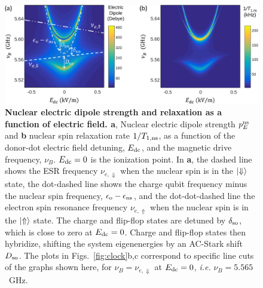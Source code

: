 \begin{figure}
	\centering
	\includegraphics[width=1\textwidth]{fig4_v2}
	\caption[Nuclear electric dipole strength and relaxation as a function of electric field]{\textbf{Nuclear electric dipole strength and relaxation as a function of electric field. a},
	 Nuclear electric dipole strength $p_E^{\rm ns}$ and
		\textbf{b} nuclear spin relaxation rate $1/T_{\rm 1,ns}$, as a function of the donor-dot electric field detuning, $E_{\rm dc}$, and the magnetic drive frequency, $\nu_B$. $E_{\rm dc}=0$ is the ionization point. In \textbf{a}, the dashed line shows the ESR frequency $\nu_{e,\Downarrow}$ when the nuclear spin is in the  $\ket{\Downarrow}$ state, the dot-dashed line shows the charge qubit frequency minus the nuclear spin frequency, $\epsilon_{\rm o} - \epsilon_{\rm ns}$, and the dot-dot-dashed line the electron spin resonance frequency $\nu_{e,\Uparrow}$ when the nuclear spin is in the $\ket{\Uparrow}$ state. The charge and flip-flop states are detuned by $\delta_{\rm so}$, which is close to zero at $E_{\rm dc}=0$. Charge and flip-flop states then hybridize, shifting the system eigenenergies by an AC-Stark shift $D_{\rm so}$. The plots in Figs.~\ref{fig:clock}b,c correspond to specific line cuts of the graphs shown here, for $\nu_B=\nu_{e,\Downarrow}$ at $E_{\rm dc}=0$, \textit{i.e.} $\nu_B=5.565$~GHz.
	}
	\label{fig:fig4}
\end{figure}

